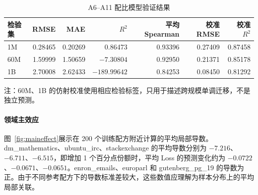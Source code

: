 \documentclass[bwprint]{gmcmthesis}
\numberwithin{equation}{section}
\numberwithin{figure}{section}
\numberwithin{table}{section}
\begin{document}
        \begin{table}[H]
        \centering
        \caption{A6--A11 配比模型验证结果}  %
        \label{tab:validation}
        \begin{threeparttable}
        \begin{tabular}{lrrrrrr}
        \toprule
        检验集 & RMSE & MAE & $R^2$ & 平均 Spearman & 校准 RMSE & 校准 $R^2$ \\
        \midrule
        1M & 0.28465 & 0.20269 & 0.86473 & 0.93396 & 0.27409 & 0.87458 \\
        60M & 1.59999 & 1.50659 & $-7.30804$ & 0.92950 & 0.21371 & 0.85178 \\
        1B & 2.70008 & 2.62433 & $-189.99642$ & 0.84253 & 0.08450 & 0.81292 \\
        \bottomrule
        \end{tabular}
        \begin{tablenotes}\small
        \item 注：60M、1B 的仿射校准使用相应检验标签，只用于描述跨规模单调迁移，不是独立预测。
        \end{tablenotes}
        \end{threeparttable}
        \end{table}
        


        \paragraph{领域主效应}
        图~\ref{fig:maineffect}展示在 200 个训练配方附近计算的平均局部导数。dm\_mathematics、ubuntu\_irc、stackexchange 的平均导数分别为 $-7.216$、$-6.711$、$-6.515$，即增加 1 个百分点份额时，平均 Loss 的预测变化约为 $-0.0722$、$-0.0671$、$-0.0651$。enron\_emails、europarl 和 gutenberg\_pg\_19 的导数为正。由于不同参考配方下的导数标准差较大，这些数值应理解为样本分布上的平均局部关联。
        
\end{document}
